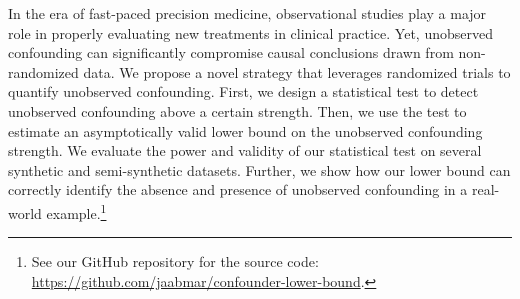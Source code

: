 In the era of fast-paced precision medicine, observational studies play a major role in properly evaluating new treatments in clinical practice. Yet, unobserved confounding can significantly compromise causal conclusions drawn from non-randomized data. We propose a novel strategy that leverages randomized trials to quantify unobserved confounding. First, we design a statistical test to detect unobserved confounding above a certain strength. Then, we use the test to estimate an asymptotically valid lower bound on the unobserved confounding strength. We evaluate the power and validity of our statistical test on several synthetic and semi-synthetic datasets. Further, we show how our lower bound can correctly identify the absence and presence of unobserved confounding in a real-world example.\footnote{See our GitHub repository for the source code: \url{https://github.com/jaabmar/confounder-lower-bound}.}

 


